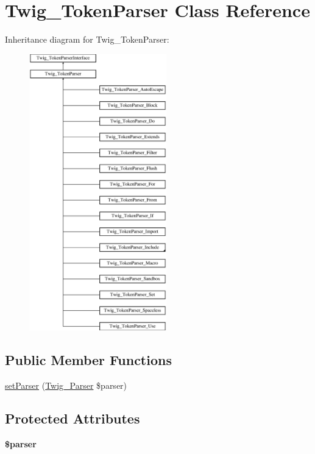 \hypertarget{class_twig___token_parser}{}\section{Twig\+\_\+\+Token\+Parser Class Reference}
\label{class_twig___token_parser}
Inheritance diagram for Twig\+\_\+\+Token\+Parser\+:\begin{figure}[H]
\begin{center}
\leavevmode
\includegraphics[height=12.000000cm]{class_twig___token_parser}
\end{center}
\end{figure}
\subsection*{Public Member Functions}
\begin{DoxyCompactItemize}
\item 
\hyperlink{class_twig___token_parser_a68fca2cbecd7ee6643879ae3d5c6f129}{set\+Parser} (\hyperlink{class_twig___parser}{Twig\+\_\+\+Parser} \$parser)
\end{DoxyCompactItemize}
\subsection*{Protected Attributes}
\begin{DoxyCompactItemize}
\item 
\hypertarget{class_twig___token_parser_a147a766daa03d52576c7345fea31c945}{}{\bfseries \$parser}\label{class_twig___token_parser_a147a766daa03d52576c7345fea31c945}

\end{DoxyCompactItemize}


